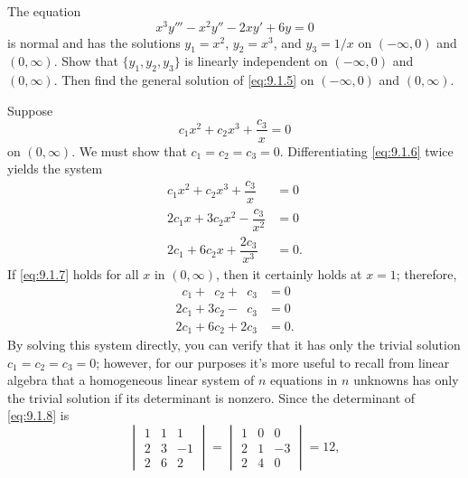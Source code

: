 \begin{example}\label{example:9.1.1}
The equation
\begin{equation}\label{eq:9.1.5}
x^3y'''-x^2y''-2xy'+6y=0
\end{equation}
is normal and has the solutions $y_1=x^2$, $y_2=x^3$, and $y_3=1/x$ on
$(-\infty,0)$ and $(0,\infty)$.  Show that $\{y_1,y_2,y_3\}$
is linearly independent on $(-\infty, 0)$ and $(0,\infty)$. Then find
the general solution of \eqref{eq:9.1.5} on $(-\infty, 0)$ and
$(0,\infty)$.
\end{example}

\begin{solution}
Suppose
\begin{equation} \label{eq:9.1.6}
c_1x^2+c_2x^3+\frac{c_3}{x}=0
\end{equation}
on $(0,\infty)$. We must show that $c_1=c_2=c_3=0$. Differentiating
\eqref{eq:9.1.6} twice yields  the system
\begin{equation} \label{eq:9.1.7}
\begin{aligned}
c_1x^2+c_2x^3+\dfrac{c_3}{x}&=0\\
2c_1x+3c_2x^2-\dfrac{c_3}{x^2}&=0\\
2c_1+6c_2x+\dfrac{2c_3}{x^3}&=0.
\end{aligned}
\end{equation}
If \eqref{eq:9.1.7} holds for all $x$ in $(0,\infty)$, then it
certainly  holds at $x=1$;  therefore,
\begin{equation} \label{eq:9.1.8}
\begin{aligned}
\phantom{2}c_1+\phantom{3}c_2+\phantom{2}c_3&=0\\
2c_1+3c_2-\phantom{2}c_3&=0\\
2c_1+6c_2+2c_3&=0.
\end{aligned}
\end{equation}
By solving this system directly, you can verify that it has only the
trivial solution $c_1=c_2=c_3=0$;     however, for our purposes it's more
useful to recall from linear algebra that a homogeneous linear system
of $n$ equations in $n$ unknowns has only the trivial solution if its
determinant is nonzero. Since the determinant of \eqref{eq:9.1.8} is
\[
\begin{vmatrix}1&1&1\\2&3&-1\\2&6&2\end{vmatrix}=
\begin{vmatrix}1&0&0\\2&1&-3\\2&4&0\end{vmatrix}=12,
\]
\end{solution}
